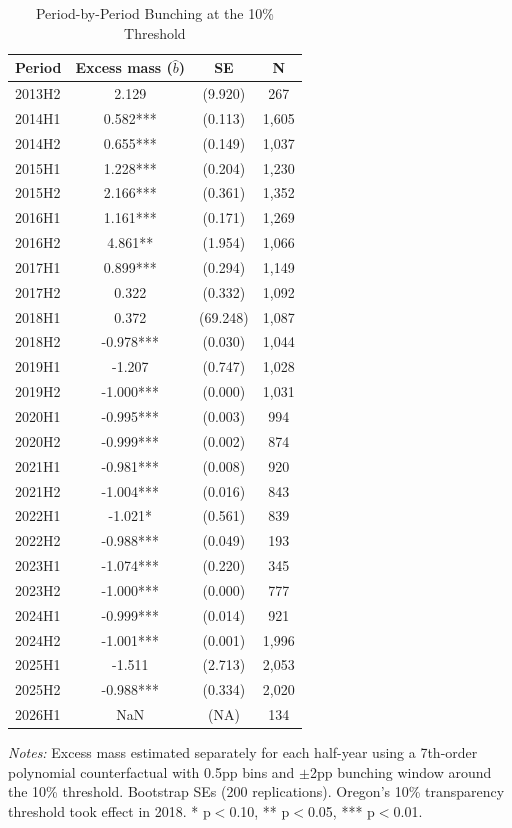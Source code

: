 \begin{table}[H]
\centering
\caption{Period-by-Period Bunching at the 10\% Threshold}
\begin{threeparttable}
\begin{tabular}{lccc}
\toprule
Period & Excess mass ($\hat{b}$) & SE & N \\
\midrule
2013H2 & 2.129 & (9.920) & 267 \\
2014H1 & 0.582*** & (0.113) & 1,605 \\
2014H2 & 0.655*** & (0.149) & 1,037 \\
2015H1 & 1.228*** & (0.204) & 1,230 \\
2015H2 & 2.166*** & (0.361) & 1,352 \\
2016H1 & 1.161*** & (0.171) & 1,269 \\
2016H2 & 4.861** & (1.954) & 1,066 \\
2017H1 & 0.899*** & (0.294) & 1,149 \\
2017H2 & 0.322 & (0.332) & 1,092 \\
2018H1 & 0.372 & (69.248) & 1,087 \\
2018H2 & -0.978*** & (0.030) & 1,044 \\
2019H1 & -1.207 & (0.747) & 1,028 \\
2019H2 & -1.000*** & (0.000) & 1,031 \\
2020H1 & -0.995*** & (0.003) & 994 \\
2020H2 & -0.999*** & (0.002) & 874 \\
2021H1 & -0.981*** & (0.008) & 920 \\
2021H2 & -1.004*** & (0.016) & 843 \\
2022H1 & -1.021* & (0.561) & 839 \\
2022H2 & -0.988*** & (0.049) & 193 \\
2023H1 & -1.074*** & (0.220) & 345 \\
2023H2 & -1.000*** & (0.000) & 777 \\
2024H1 & -0.999*** & (0.014) & 921 \\
2024H2 & -1.001*** & (0.001) & 1,996 \\
2025H1 & -1.511 & (2.713) & 2,053 \\
2025H2 & -0.988*** & (0.334) & 2,020 \\
2026H1 & NaN & (NA) & 134 \\
\bottomrule
\end{tabular}
\begin{tablenotes}[flushleft]
\small
\item \textit{Notes:} Excess mass estimated separately for each half-year using a 7th-order polynomial counterfactual with 0.5pp bins and $\pm$2pp bunching window around the 10\% threshold. Bootstrap SEs (200 replications). Oregon's 10\% transparency threshold took effect in 2018. * p$<$0.10, ** p$<$0.05, *** p$<$0.01.
\end{tablenotes}
\end{threeparttable}
\label{tab:yearly_bunching}
\end{table}

